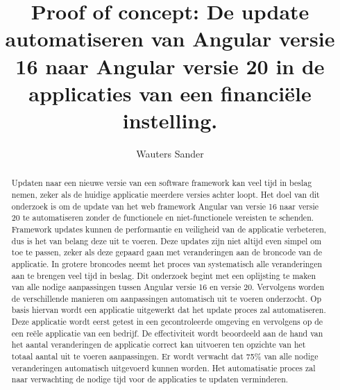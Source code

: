 \documentclass{hogent-article}
\title{Proof of concept: De update automatiseren van Angular versie 16 naar Angular versie 20 in de applicaties van een financiële instelling.}
\author{Wauters Sander}
\begin{document}
\begin{abstract}

Updaten naar een nieuwe versie van een software framework kan veel tijd in beslag nemen, zeker als de huidige applicatie meerdere versies achter loopt.
Het doel van dit onderzoek is om de update van het web framework Angular van versie 16 naar versie 20 te automatiseren zonder de functionele en niet-functionele vereisten te schenden.
Framework updates kunnen de performantie en veiligheid van de applicatie verbeteren, dus is het van belang deze uit te voeren.
Deze updates zijn niet altijd even simpel om toe te passen, zeker als deze gepaard gaan met veranderingen aan de broncode van de applicatie.
In grotere broncodes neemt het proces van systematisch alle veranderingen aan te brengen veel tijd in beslag.
Dit onderzoek begint met een oplijsting te maken van alle nodige aanpassingen tussen Angular versie 16 en versie 20.
Vervolgens worden de verschillende manieren om aanpassingen automatisch uit te voeren onderzocht.
Op basis hiervan wordt een applicatie uitgewerkt dat het update proces zal automatiseren.
Deze applicatie wordt eerst getest in een gecontroleerde omgeving en vervolgens op de een reële applicatie van een bedrijf.
De effectiviteit wordt beoordeeld aan de hand van het aantal veranderingen de applicatie correct kan uitvoeren ten opzichte van het totaal aantal uit te voeren aanpassingen.
Er wordt verwacht dat 75\% van alle nodige veranderingen automatisch uitgevoerd kunnen worden.
Het automatisatie proces zal naar verwachting de nodige tijd voor de applicaties te updaten verminderen.

\end{abstract}

\tableofcontents



\printbibliography[heading=bibintoc]
\end{document}
